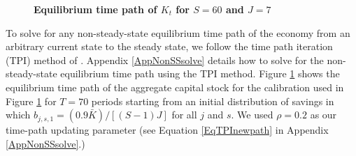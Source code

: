 \documentclass[letterpaper,12pt]{article}
\theoremstyle{definition}
\begin{document}
\begin{spacing}{1.5}
    \begin{figure}[htb]\centering \captionsetup{width=4.0in}
      \caption{\label{FigKpathTPI}\textbf{Equilibrium time path of $K_t$ for $S=60$ and $J=7$}}
    \end{figure}

    To solve for any non-steady-state equilibrium time path of the economy from an arbitrary current state to the steady state, we follow the time path iteration (TPI) method of \citet{AuerbachKotlikoff:1987}. Appendix \ref{AppNonSSsolve} details how to solve for the non-steady-state equilibrium time path using the TPI method. Figure \ref{FigKpathTPI} shows the equilibrium time path of the aggregate capital stock for the calibration used in Figure \ref{FigKpathTPI} for $T=70$ periods starting from an initial distribution of savings in which $b_{j,s,1}=(0.9\bar{K})/[(S-1)J]$ for all $j$ and $s$. We used $\rho=0.2$ as our time-path updating parameter (see Equation \eqref{EqTPInewpath} in Appendix \ref{AppNonSSsolve}.)


\clearpage

\end{spacing}

\newpage
\renewcommand{\theequation}{A.\arabic{section}.\arabic{equation}}
\renewcommand{\thesection}{A-\arabic{section}}   %
\setcounter{equation}{0}                         %
\setcounter{section}{0}                          %
\end{document}
